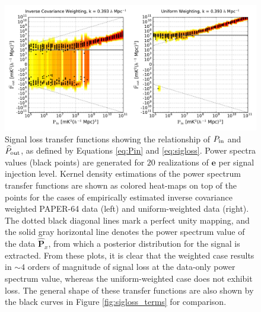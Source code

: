 \documentclass[preprint2,numberedappendix,tighten]{aastex6}
\newcommand{\cc}[1]{{\color{purple} \textbf{[CC: #1]}}}
\begin{document}
\begin{figure}
	\centering
	\includegraphics[width=1\textwidth]{plots/sigloss_transfercurve_posneg.pdf}
	\caption{Signal loss transfer functions showing the relationship of $P_{\rm in}$ and $\widehat{P}_{\rm out}$, as defined by Equations \eqref{eq:Pin} and \eqref{eq:sigloss}. Power spectra values (black points) are generated for $20$ realizations of $\textbf{e}$ per signal injection level. Kernel density estimations of the power spectrum transfer functions are shown as colored 
heat-maps on top of the points for the cases of empirically estimated inverse covariance weighted PAPER-64 data (left) and uniform-weighted data (right). The dotted black 
diagonal lines mark a perfect unity mapping, and the solid gray horizontal line denotes the power spectrum value of the data $\widehat{\textbf{P}}_{x}$, from which a posterior distribution for the signal is extracted. From these plots, it is clear that the weighted case results in $\sim4$ orders of magnitude of signal loss at the data-only power spectrum value, whereas the uniform-weighted case does 
not exhibit loss. The general shape of these transfer functions are also shown by the black curves in Figure \ref{fig:sigloss_terms} for comparison.}
	\label{fig:sigloss_transfercurve}
\end{figure}

%
\end{document}
